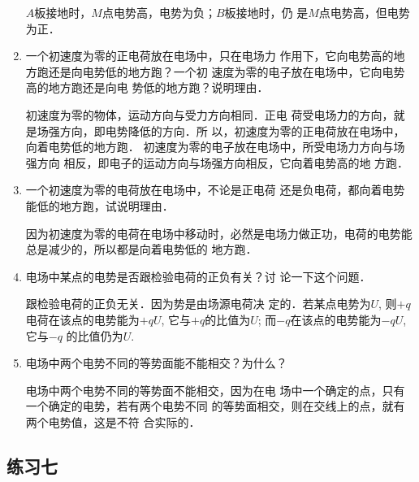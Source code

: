 \begin{enumerate}
\begin{solution}
    $A$板接地时，$M$点电势高，电势为负；$B$板接地时，仍
    是$M$点电势高，但电势为正．
\end{solution}

\item 一个初速度为零的正电荷放在电场中，只在电场力
作用下，它向电势高的地方跑还是向电势低的地方跑？一个初
速度为零的电子放在电场中，它向电势高的地方跑还是向电
势低的地方跑？说明理由．

\begin{solution}
    初速度为零的物体，运动方向与受力方向相同．正电
    荷受电场力的方向，就是场强方向，即电势降低的方向．所
    以，初速度为零的正电荷放在电场中，向着电势低的地方跑．
    初速度为零的电子放在电场中，所受电场力方向与场强方向
    相反，即电子的运动方向与场强方向相反，它向着电势高的地
    方跑．
\end{solution}

\item 一个初速度为零的电荷放在电场中，不论是正电荷
还是负电荷，都向着电势能低的地方跑，试说明理由．

\begin{solution}
    因为初速度为零的电荷在电场中移动时，必然是电场力做正功，电荷的电势能总是减少的，所以都是向着电势低的
    地方跑．
\end{solution}

\item 电场中某点的电势是否跟检验电荷的正负有关？讨
论一下这个问题．

\begin{solution}
    跟检验电荷的正负无关．因为势是由场源电荷决
    定的．若某点电势为$U$, 则$+q$电荷在该点的电势能为$+qU$,
    它与$+q$的比值为$U$; 而$-q$在该点的电势能为$-qU$, 它与$-q$
    的比值仍为$U$.
\end{solution}

\item 电场中两个电势不同的等势面能不能相交？为什么？

\begin{solution}
    电场中两个电势不同的等势面不能相交，因为在电
    场中一个确定的点，只有一个确定的电势，若有两个电势不同
    的等势面相交，则在交线上的点，就有两个电势值，这是不符
    合实际的．
\end{solution}

\end{enumerate}



\subsection{练习七}

